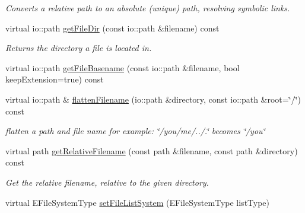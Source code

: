\begin{DoxyCompactItemize}
\begin{DoxyCompactList}\small\item\em Converts a relative path to an absolute (unique) path, resolving symbolic links. \end{DoxyCompactList}\item 
virtual io\-::path \hyperlink{classirr_1_1io_1_1_c_file_system_adcea7d28f61cde3d2aa972c208576d47}{get\-File\-Dir} (const io\-::path \&filename) const 
\begin{DoxyCompactList}\small\item\em Returns the directory a file is located in. \end{DoxyCompactList}\item 
virtual io\-::path \hyperlink{classirr_1_1io_1_1_c_file_system_a02f2b5b3386eb9522be3befc9bdca9b0}{get\-File\-Basename} (const io\-::path \&filename, bool keep\-Extension=true) const 
\item 
\hypertarget{classirr_1_1io_1_1_c_file_system_a71073fb3a0fb03d451c99ffe399783df}{virtual io\-::path \& \hyperlink{classirr_1_1io_1_1_c_file_system_a71073fb3a0fb03d451c99ffe399783df}{flatten\-Filename} (io\-::path \&directory, const io\-::path \&root=\char`\"{}/\char`\"{}) const }\label{classirr_1_1io_1_1_c_file_system_a71073fb3a0fb03d451c99ffe399783df}

\begin{DoxyCompactList}\small\item\em flatten a path and file name for example\-: \char`\"{}/you/me/../.\char`\"{} becomes \char`\"{}/you\char`\"{} \end{DoxyCompactList}\item 
\hypertarget{classirr_1_1io_1_1_c_file_system_a9f63d23890941f8dae5b6aaac7c08004}{virtual path \hyperlink{classirr_1_1io_1_1_c_file_system_a9f63d23890941f8dae5b6aaac7c08004}{get\-Relative\-Filename} (const path \&filename, const path \&directory) const }\label{classirr_1_1io_1_1_c_file_system_a9f63d23890941f8dae5b6aaac7c08004}

\begin{DoxyCompactList}\small\item\em Get the relative filename, relative to the given directory. \end{DoxyCompactList}\item 
\hypertarget{classirr_1_1io_1_1_c_file_system_a9778e874ac48202a820626f05557c7a5}{virtual E\-File\-System\-Type \hyperlink{classirr_1_1io_1_1_c_file_system_a9778e874ac48202a820626f05557c7a5}{set\-File\-List\-System} (E\-File\-System\-Type list\-Type)}\label{classirr_1_1io_1_1_c_file_system_a9778e874ac48202a820626f05557c7a5}


\end{DoxyCompactItemize}
